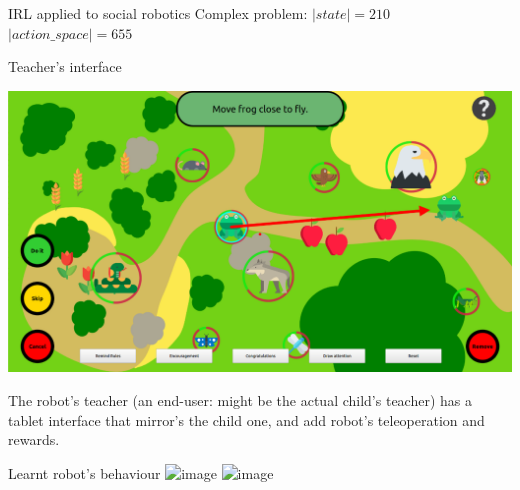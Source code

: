 \documentclass[xcolor=table]{beamer}
\begin{document}
{\begin{frame}{IRL applied to social robotics}
    Complex problem: 
    $|state| = 210$ $| action\_space| = 655$

\end{frame}


\begin{frame}{Teacher's interface}
    \begin{center}
        \includegraphics[width=0.9\linewidth]{sparc/woz-gui}
    \end{center}

    The robot's teacher (an end-user: might be the actual child's teacher) has a
    tablet interface that mirror's the child one, and add robot's teleoperation
    and rewards.

\end{frame}




\begin{frame}{Learnt robot's behaviour}
    \includegraphics<1>[width=0.9\linewidth]{sparc/actions-supervised}
    \includegraphics<2>[width=0.9\linewidth]{sparc/actions}




\end{frame}
}
\end{document}
